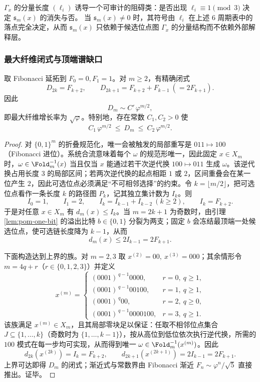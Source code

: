 \begin{corollary}\label{cor:pom-fiber-signed-index-mod3}
\(\Gamma_x\) 的分量长度 \((\ell_i)\) 诱导一个可审计的阻碍类：是否出现 \(\ell_i\equiv 1\pmod 3\) 决定 \(\mathfrak{s}_m(x)\) 的消失与否。
当 \(\mathfrak{s}_m(x)\neq 0\) 时，其符号由 \(\ell_i\) 在上述 \(6\) 周期表中的落点完全决定，从而 \(\mathfrak{s}_m(x)\) 只依赖于候选位点图 \(\Gamma_x\) 的分量结构而不依赖外部解释层。
\end{corollary}

\subsubsection{最大纤维闭式与顶端谱缺口}\label{subsec:pom-top-fiber}
\begin{theorem}[最大纤维闭式]\label{thm:pom-max-fiber}
取 Fibonacci 延拓到 $F_0=0,F_1=1$。对 $m\ge 2$，有精确闭式
\[
D_{2k}=F_{k+2},
\qquad
D_{2k+1}=F_{k+2}+F_{k-1}\ (=2F_{k+1}).
\]
因此
\[
D_m\sim C'\,\varphi^{m/2},
\]
即最大纤维增长率为 $\sqrt{\varphi}$。特别地，存在常数 $C_1,C_2>0$ 使
\[
C_1\,\varphi^{m/2}\ \le\ D_m\ \le\ C_2\,\varphi^{m/2}.
\]
\end{theorem}
\begin{proof}
对 $\{0,1\}^m$ 的折叠规范化，唯一会被触发的局部重写是
\(
011\mapsto 100
\)
（Fibonacci 进位）。系统合流意味着每个 $\omega$ 的规范形唯一，因此固定 $x\in X_m$ 时，$\omega\in\Fold_m^{-1}(x)$ 当且仅当 $x$ 能通过若干次逆代换 $100\mapsto 011$ 生成 $\omega$。该逆代换占用长度 $3$ 的局部区间；若两次逆代换的起点相距 $1$ 或 $2$，区间重叠会在某一位产生 $2$，因此可选位点必须满足“不可相邻选择”的约束。令 $k=\lfloor m/2\rfloor$，把可选位点看作一条长度 $k$ 的路径图 $P_k$，记其独立集计数为 $I_k$。则
\[
I_0=1,\qquad I_1=2,\qquad I_k=I_{k-1}+I_{k-2}\ (k\ge 2),
\qquad I_k=F_{k+2}.
\]
于是对任意 $x\in X_m$ 有 $d_m(x)\le I_k$。当 $m=2k+1$ 为奇数时，由引理 \ref{lem:pom-one-bit} 的溢出比特 $b\in\{0,1\}$ 分裂为两支；固定 $b$ 会冻结最顶端一处候选位点，使可选链长度降为 $k-1$，从而
\[
d_m(x)\le 2I_{k-1}=2F_{k+1}.
\]

下面构造达到上界的族。对 $m=2,3$ 取
\(
x^{(2)}=00,\ x^{(3)}=000
\)；其余情形令 $m=4q+r$（$r\in\{0,1,2,3\}$）并定义
\[
x^{(m)}=
\begin{cases}
(0001)^{\,q-1}0000,& r=0,\ q\ge 1,\\[2pt]
(0001)^{\,q-1}00100,& r=1,\ q\ge 1,\\[2pt]
(0001)^{\,q}00,& r=2,\ q\ge 0,\\[2pt]
(0001)^{\,q-1}0000100,& r=3,\ q\ge 1.
\end{cases}
\]
该族满足 $x^{(m)}\in X_m$，且其局部零块足以保证：任取不相邻位点集合 $J\subseteq\{1,\dots,k\}$（奇数时为 $\{1,\dots,k-1\}$），按从高位到低位依次执行逆代换，所需的 $100$ 模式在每一步均可实现，从而得到唯一 $\omega\in\Fold_m^{-1}(x^{(m)})$。因此
\[
d_{2k}(x^{(2k)})=I_k=F_{k+2},
\qquad
d_{2k+1}(x^{(2k+1)})=2I_{k-1}=2F_{k+1}.
\]
上界可达即得 $D_m$ 的闭式；渐近式与常数界由 Fibonacci 渐近 $F_n\sim \varphi^n/\sqrt5$ 直接推出。证毕。
\end{proof}

